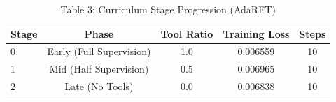 \begin{table}[htbp]
  \centering
  \caption{Table 3: Curriculum Stage Progression (AdaRFT)}
  \begin{tabular}{lcccc}
    \toprule
    \textbf{Stage} & \textbf{Phase} & \textbf{Tool Ratio} & \textbf{Training Loss} & \textbf{Steps} \\
    \midrule
    0 & Early (Full Supervision) & 1.0 & 0.006559 & 10 \\
    1 & Mid (Half Supervision) & 0.5 & 0.006965 & 10 \\
    2 & Late (No Tools) & 0.0 & 0.006838 & 10 \\
    \bottomrule
  \end{tabular}
\end{table}